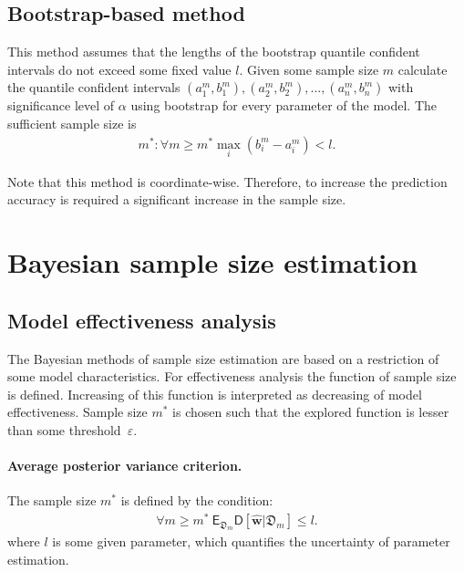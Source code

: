 \documentclass[
11pt,%
tightenlines,%
twoside,%
onecolumn,%
nofloats,%
nobibnotes,%
nofootinbib,%
superscriptaddress,%
noshowpacs,%
centertags]%
{revtex4}
\begin{document}
\subsection{Bootstrap-based method}
This method assumes that the lengths of the bootstrap quantile confident intervals do not exceed some fixed value $l$. Given some sample size $m$ calculate the quantile confident intervals $\left(a^m_1, b^m_1\right), \left(a^m_2, b^m_2\right), ..., \left(a^m_n, b^m_n\right)$ with significance level of $\alpha$ using bootstrap for every parameter of the model. The sufficient sample size is
\begin{equation}
\label{eq:hb:8}
\begin{aligned}
	m^*: \forall m\geq m^* \max_i\left(b^m_i - a^m_i\right) < l.
\end{aligned}
\end{equation}
    
Note that this method is coordinate-wise. Therefore, to increase the prediction accuracy is required a significant increase in the sample size.
    
\section{Bayesian sample size estimation}
\subsection{Model effectiveness analysis}
The Bayesian methods of sample size estimation are based on a restriction of some model characteristics. For effectiveness analysis the function of sample size is defined. Increasing of this function is interpreted as decreasing of model effectiveness. Sample size $m^*$ is chosen such that the explored function is lesser than some threshold~$\varepsilon$.

\paragraph{Average posterior variance criterion.}
The sample size $m^*$ is defined by the condition:
\begin{equation}
\label{eq:bs:1}
\begin{aligned}
	\forall m \geq m^*  ~ \mathsf{E}_{\mathfrak{D}_m}\mathsf{D}\left[\hat{\textbf{w}}|\mathfrak{D}_m\right] \leq l.
\end{aligned}
\end{equation}
where $l$ is some given parameter, which quantifies the uncertainty of parameter estimation.
\end{document}
